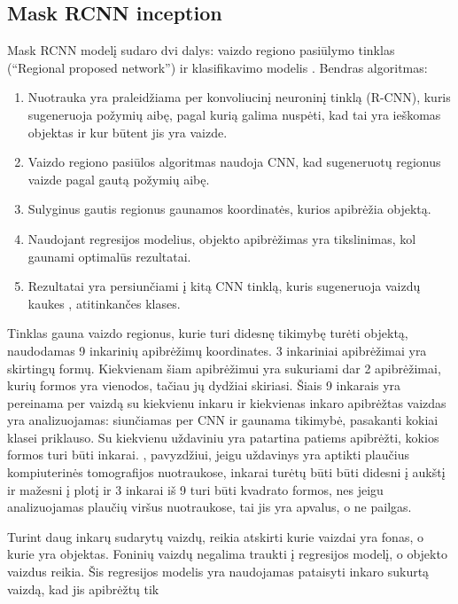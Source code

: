 \documentclass{VUMIFInfKursinis}
\begin{document}
\subsection{Mask RCNN inception}
\par
Mask RCNN modelį sudaro dvi dalys: vaizdo regiono pasiūlymo tinklas (\enquote{Regional proposed network}) ir
klasifikavimo modelis \cite{salt14}. Bendras algoritmas:
\begin{enumerate}
\item Nuotrauka yra praleidžiama per konvoliucinį neuroninį tinklą (R-CNN), kuris
sugeneruoja požymių aibę, pagal kurią galima nuspėti, kad tai yra ieškomas objektas
ir kur būtent jis yra vaizde.
\item Vaizdo regiono pasiūlos algoritmas naudoja CNN, kad sugeneruotų regionus vaizde pagal
gautą požymių aibę.
\item Sulyginus gautis regionus gaunamos koordinatės, kurios apibrėžia objektą.
\item Naudojant regresijos modelius, objekto apibrėžimas yra tikslinimas, kol gaunami
optimalūs rezultatai.
\item Rezultatai yra persiunčiami į kitą CNN tinklą, kuris sugeneruoja vaizdų kaukes
, atitinkančes klases.
\end{enumerate}
\par
Tinklas gauna vaizdo regionus, kurie turi didesnę tikimybę turėti objektą, naudodamas
9 inkarinių apibrėžimų koordinates.
3 inkariniai apibrėžimai yra skirtingų formų. Kiekvienam šiam apibrėžimui yra sukuriami
dar 2 apibrėžimai, kurių formos yra vienodos, tačiau jų dydžiai skiriasi. Šiais 9
inkarais yra pereinama per vaizdą su kiekvienu inkaru ir kiekvienas inkaro apibrėžtas
vaizdas yra analizuojamas: siunčiamas per CNN ir gaunama tikimybė, pasakanti kokiai klasei priklauso. Su kiekvienu uždaviniu yra patartina patiems apibrėžti, kokios formos turi būti inkarai. \cite{salt15}
, pavyzdžiui, jeigu uždavinys yra aptikti plaučius kompiuterinės tomografijos nuotraukose,
inkarai turėtų būti būti didesni į aukštį ir mažesni į plotį ir 3 inkarai iš 9 turi būti
kvadrato formos, nes jeigu analizuojamas plaučių viršus nuotraukose, tai jis yra apvalus,
o ne pailgas.
\par
Turint daug inkarų sudarytų vaizdų, reikia atskirti kurie vaizdai yra fonas, o kurie
yra objektas. Foninių vaizdų negalima traukti į regresijos modelį, o objekto vaizdus reikia.
Šis regresijos modelis yra naudojamas pataisyti inkaro sukurtą vaizdą, kad jis apibrėžtų tik
\end{document}
